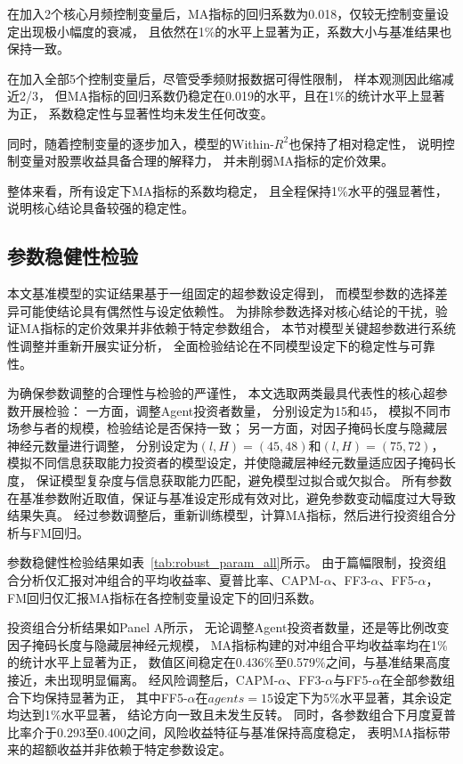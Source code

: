 在加入2个核心月频控制变量后，MA指标的回归系数为0.018，仅较无控制变量设定出现极小幅度的衰减，
且依然在1\%的水平上显著为正，系数大小与基准结果也保持一致。

在加入全部5个控制变量后，尽管受季频财报数据可得性限制，
样本观测因此缩减近2/3，
但MA指标的回归系数仍稳定在0.019的水平，且在1\%的统计水平上显著为正，
系数稳定性与显著性均未发生任何改变。

同时，随着控制变量的逐步加入，模型的Within-$R^2$也保持了相对稳定性，
说明控制变量对股票收益具备合理的解释力，
并未削弱MA指标的定价效果。

整体来看，所有设定下MA指标的系数均稳定，
且全程保持1\%水平的强显著性，
说明核心结论具备较强的稳定性。

 \FloatBarrier

\subsection{参数稳健性检验}

本文基准模型的实证结果基于一组固定的超参数设定得到，
而模型参数的选择差异可能使结论具有偶然性与设定依赖性。
为排除参数选择对核心结论的干扰，验证MA指标的定价效果并非依赖于特定参数组合，
本节对模型关键超参数进行系统性调整并重新开展实证分析，
全面检验结论在不同模型设定下的稳定性与可靠性。

为确保参数调整的合理性与检验的严谨性，
本文选取两类最具代表性的核心超参数开展检验：
一方面，调整Agent投资者数量，
分别设定为15和45，
模拟不同市场参与者的规模，检验结论是否保持一致；
另一方面，对因子掩码长度与隐藏层神经元数量进行调整，
分别设定为$(l,H)=(45,48)$和$(l,H)=(75,72)$，
模拟不同信息获取能力投资者的模型设定，并使隐藏层神经元数量适应因子掩码长度，
保证模型复杂度与信息获取能力匹配，避免模型过拟合或欠拟合。
所有参数在基准参数附近取值，保证与基准设定形成有效对比，避免参数变动幅度过大导致结果失真。
经过参数调整后，重新训练模型，计算MA指标，然后进行投资组合分析与FM回归。

参数稳健性检验结果如表~\ref{tab:robust_param_all}所示。
由于篇幅限制，投资组合分析仅汇报对冲组合的平均收益率、夏普比率、CAPM-$\alpha$、FF3-$\alpha$、FF5-$\alpha$，
FM回归仅汇报MA指标在各控制变量设定下的回归系数。

投资组合分析结果如Panel A所示，
无论调整Agent投资者数量，还是等比例改变因子掩码长度与隐藏层神经元规模，
MA指标构建的对冲组合平均收益率均在1\%的统计水平上显著为正，
数值区间稳定在0.436\%至0.579\%之间，与基准结果高度接近，未出现明显偏离。
经风险调整后，CAPM-$\alpha$、FF3-$\alpha$与FF5-$\alpha$在全部参数组合下均保持显著为正，
其中FF5-$\alpha$在$agents=15$设定下为5\%水平显著，其余设定均达到1\%水平显著，
结论方向一致且未发生反转。
同时，各参数组合下月度夏普比率介于$0.293$至$0.400$之间，风险收益特征与基准保持高度稳定，
表明MA指标带来的超额收益并非依赖于特定参数设定。

